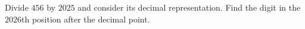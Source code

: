Divide $456$ by $2025$ and consider its decimal representation. Find the digit in the $2026$th position after the decimal point.
